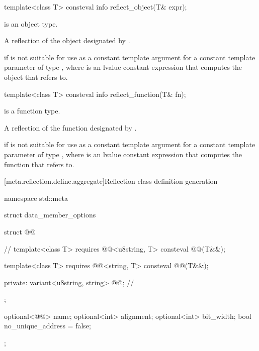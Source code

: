 %
\begin{itemdecl}
template<class T>
  consteval info reflect_object(T& expr);
\end{itemdecl}

\begin{itemdescr}
\pnum
\mandates
{} is an object type.

\pnum
\returns
A reflection of the object designated by .

\pnum
\throws
{} if
 is not suitable for use as a constant template argument
for a constant template parameter of type ,
where  is an lvalue constant expression that
computes the object that  refers to.
\end{itemdescr}

%
\begin{itemdecl}
template<class T>
  consteval info reflect_function(T& fn);
\end{itemdecl}

\begin{itemdescr}
\pnum
\mandates
{} is a function type.

\pnum
\returns
A reflection of the function designated by .

\pnum
\throws
{} if
 is not suitable for use as a constant template argument
for a constant template parameter of type ,
where  is an lvalue constant expression that
computes the function that  refers to.
\end{itemdescr}

[meta.reflection.define.aggregate]{Reflection class definition generation}

%
\begin{codeblock}
namespace std::meta {
  struct data_member_options {
    struct @@ {                          // \expos
      template<class T>
        requires @@<u8string, T>
        consteval @@(T&&);

      template<class T>
        requires @@<string, T>
        consteval @@(T&&);

    private:
      variant<u8string, string> @@;       // \expos
    };

    optional<@@> name;
    optional<int> alignment;
    optional<int> bit_width;
    bool no_unique_address = false;
  };
}
\end{codeblock}

